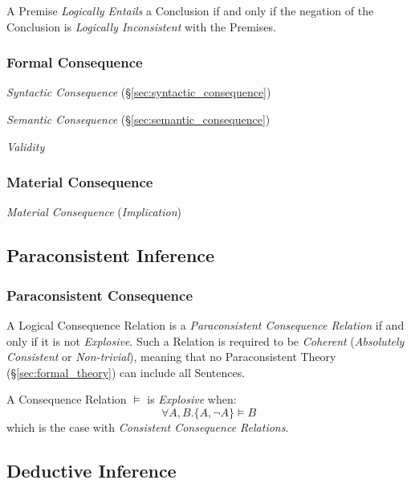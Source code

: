A Premise \emph{Logically Entails} a Conclusion if and only if the
negation of the Conclusion is \emph{Logically Inconsistent} with the
Premises.



\subsubsection{Formal Consequence}\label{sec:formal_consequence}

\emph{Syntactic Consequence} (\S\ref{sec:syntactic_consequence})

\emph{Semantic Consequence} (\S\ref{sec:semantic_consequence})

\emph{Validity}



\subsubsection{Material Consequence}

\emph{Material Consequence} (\emph{Implication})



\subsection{Paraconsistent Inference}\label{sec:paraconsistent_inference}
\cite{priest-tanaka-weber13}

\subsubsection{Paraconsistent Consequence}\label{sec:paraconsistent_consequence}

A Logical Consequence Relation is a \emph{Paraconsistent Consequence
  Relation} if and only if it is not \emph{Explosive}. Such a Relation
is required to be \emph{Coherent} (\emph{Absolutely Consistent} or
\emph{Non-trivial}), meaning that no Paraconsistent Theory
(\S\ref{sec:formal_theory}) can include all Sentences.

A Consequence Relation $\vDash$ is \emph{Explosive} when:
\[
    \forall A, B. \{A, \neg A\} \vDash B
\]
which is the case with \emph{Consistent Consequence Relations}.




\subsection{Deductive Inference}\label{sec:deductive_inference}

